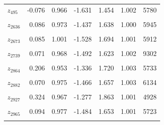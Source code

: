 \begin{longtable}{lrrrrrr}
$z_{495}$ & -0.076 & 0.966 & -1.631 & 1.454 & 1.002 & 5780\\
\cellcolor{gray!10}{$z_{2632}$} & \cellcolor{gray!10}{0.067} & \cellcolor{gray!10}{0.959} & \cellcolor{gray!10}{-1.449} & \cellcolor{gray!10}{1.582} & \cellcolor{gray!10}{1.002} & \cellcolor{gray!10}{6353}\\
$z_{2636}$ & 0.086 & 0.973 & -1.437 & 1.638 & 1.000 & 5945\\
\cellcolor{gray!10}{$z_{2640}$} & \cellcolor{gray!10}{0.204} & \cellcolor{gray!10}{0.946} & \cellcolor{gray!10}{-1.284} & \cellcolor{gray!10}{1.678} & \cellcolor{gray!10}{1.001} & \cellcolor{gray!10}{5812}\\
$z_{2673}$ & 0.085 & 1.001 & -1.528 & 1.694 & 1.001 & 5912\\
\cellcolor{gray!10}{$z_{2692}$} & \cellcolor{gray!10}{-0.237} & \cellcolor{gray!10}{0.950} & \cellcolor{gray!10}{-1.753} & \cellcolor{gray!10}{1.288} & \cellcolor{gray!10}{1.000} & \cellcolor{gray!10}{5577}\\
$z_{2739}$ & 0.071 & 0.968 & -1.492 & 1.623 & 1.002 & 9302\\
\cellcolor{gray!10}{$z_{2859}$} & \cellcolor{gray!10}{-0.506} & \cellcolor{gray!10}{1.024} & \cellcolor{gray!10}{-2.091} & \cellcolor{gray!10}{1.120} & \cellcolor{gray!10}{1.002} & \cellcolor{gray!10}{2898}\\
$z_{2864}$ & 0.206 & 0.953 & -1.336 & 1.720 & 1.003 & 5733\\
\cellcolor{gray!10}{$z_{2866}$} & \cellcolor{gray!10}{0.230} & \cellcolor{gray!10}{0.960} & \cellcolor{gray!10}{-1.318} & \cellcolor{gray!10}{1.764} & \cellcolor{gray!10}{1.003} & \cellcolor{gray!10}{5882}\\
$z_{2882}$ & 0.070 & 0.975 & -1.466 & 1.657 & 1.003 & 6134\\
\cellcolor{gray!10}{$z_{2886}$} & \cellcolor{gray!10}{0.061} & \cellcolor{gray!10}{1.001} & \cellcolor{gray!10}{-1.526} & \cellcolor{gray!10}{1.657} & \cellcolor{gray!10}{1.001} & \cellcolor{gray!10}{6438}\\
$z_{2927}$ & 0.324 & 0.967 & -1.277 & 1.863 & 1.001 & 4928\\
\cellcolor{gray!10}{$z_{2957}$} & \cellcolor{gray!10}{0.542} & \cellcolor{gray!10}{1.040} & \cellcolor{gray!10}{-1.162} & \cellcolor{gray!10}{2.181} & \cellcolor{gray!10}{1.002} & \cellcolor{gray!10}{2177}\\
$z_{2965}$ & 0.094 & 0.977 & -1.484 & 1.653 & 1.001 & 5723\\
\cellcolor{gray!10}{$z_{2974}$} & \cellcolor{gray!10}{-0.262} & \cellcolor{gray!10}{0.969} & \cellcolor{gray!10}{-1.791} & \cellcolor{gray!10}{1.335} & \cellcolor{gray!10}{1.004} & \cellcolor{gray!10}{5529}\\

\end{longtable}
